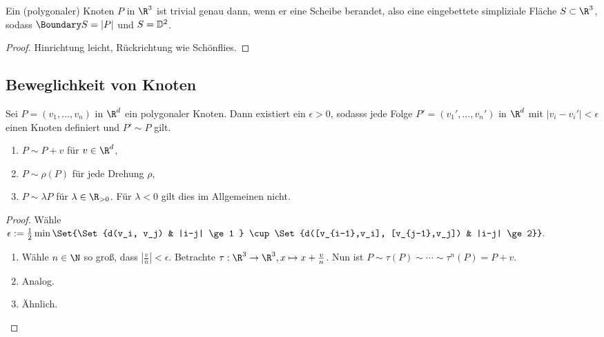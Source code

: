 \begin{ex}
    Ein (polygonaler) Knoten $P$ in $\R^3$ ist trivial genau dann, wenn er eine Scheibe berandet, also eine eingebettete simpliziale Fläche $S \subset \R^3$, sodass $\Boundary S = |P|$ und $S = \mathbb { D }^2$.
    \begin{proof}
        Hinrichtung leicht, Rückrichtung wie Schönflies.
    \end{proof}
\end{ex}

\subsection{Beweglichkeit von Knoten}

\begin{st}
    Sei $P = (v_1, \dotsc, v_n)$ in $\R^d$ ein polygonaler Knoten.
    Dann existiert ein $\epsilon > 0$, sodasss jede Folge $P' = (v_1', \dotsc, v_n')$ in $\R^d$ mit $|v_i - v_i'| < \epsilon$ einen Knoten definiert und $P' \sim P$ gilt.
    \begin{enumerate}[(1)]
        \item
            $P \sim P + v$ für $v \in \R^d$,
        \item
            $P \sim \rho(P)$ für jede Drehung $\rho$,
        \item
            $P \sim \lambda P$ für $\lambda \in \R_{>0}$.
            Für $\lambda < 0$ gilt dies im Allgemeinen nicht.
    \end{enumerate}
    \begin{proof}
        Wähle
        \begin{math}
            \epsilon := \frac{1}{2} \min \Set{\Set{d(v_i, v_j) & |i-j| \ge 1 } \cup \Set{d([v_{i-1},v_i], [v_{j-1},v_j]) & |i-j| \ge 2}}.
        \end{math}
        \begin{enumerate}[(1)]
            \item
                Wähle $n \in \N$ so groß, dass $|\frac{v}{n}| < \epsilon$.
                Betrachte $\tau: \R^3 \to \R^3, x \mapsto x + \frac{v}{n}$.
                Nun ist $P \sim \tau(P) \sim \dotsb \sim \tau^n(P) = P + v$.
            \item
                Analog.
            \item
                Ähnlich.
        \end{enumerate}
    \end{proof}
\end{st}

